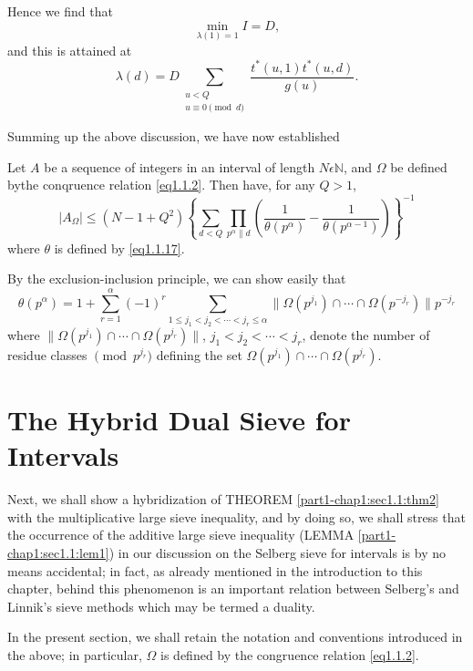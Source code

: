 Hence we find that
$$
\min_{\lambda(1)=1} I = D,
$$
and this is attained at
\begin{equation*}
  \lambda(d)=D \sum_{\substack{u<Q \\ u \equiv 0 \pmod{d}}}
  \frac{t^{*}(u,1)t^{*}(u,d)}{g(u)}.\tag{1.1.25} \label{eq1.1.25}
\end{equation*}

Summing up the above discussion, we have now established
\begin{theorem}\label{part1-chap1:sec1.1:thm2}%
  Let $A$ be a sequence of
  integers in an interval of length $N \epsilon \mathbb{N}$, and
  $\Omega$ be defined by\pageoriginale the conqruence relation
  \eqref{eq1.1.2}. Then have, for any $Q>1$,
  $$
  |A_{\Omega}|\le (N-1+Q^{2})\left\{\sum_{d<Q} \prod_{p^{\alpha} \|d}
  \left(\frac{1}{\theta(p^{\alpha})}-\frac{1}{\theta(p^{\alpha-1})}\right)
  \right\}^{-1}  
  $$
  where $\theta$ is defined by \eqref{eq1.1.17}.
\end{theorem}

\begin{remark*}
 By the exclusion-inclusion principle, we can show easily that
 $$
 \theta(p^{\alpha})=1+\sum^{\alpha}_{r=1}(-1)^r \sum_{1\le
   j_1<j_2< \cdots < j_r \le \alpha}\| \Omega (p^{j_1})\cap
 \cdots \cap \Omega (p^{-j_r})\| p^{-j_r} 
 $$
 where $\| \Omega(p^{j_1})\cap \cdots \cap \Omega (p^{j_r})\|$,
 $j_1<j_2<\cdots <j_r$, denote the number of residue classes
 $\pmod{p^{j_r}}$ defining the set $\Omega(p^{j_1})\cap \cdots
 \cap \Omega (p^{j_r})$. 
\end{remark*}

\section{The Hybrid Dual Sieve for Intervals}\label{part1-chap1:sec1.2}%

Next, we shall show a hybridization of
THEOREM \ref{part1-chap1:sec1.1:thm2} with the 
multiplicative large sieve inequality, and by doing so, we shall
stress that the occurrence of the additive large sieve inequality
(LEMMA \ref{part1-chap1:sec1.1:lem1}) in our discussion on the Selberg
sieve for intervals is by 
no means accidental; in fact, as already mentioned in the introduction
to this chapter, behind this phenomenon is an important relation
between Selberg's and Linnik's sieve methods which may be termed a
duality. 

In the present section, we shall retain the notation and conventions
introduced in the above; in particular, $\Omega$ is defined by the
congruence relation \eqref{eq1.1.2}. 


